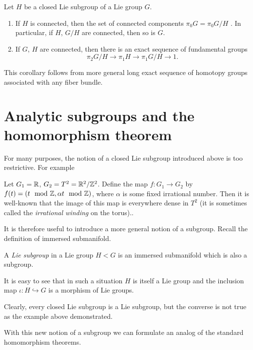 \begin{corollary}
  Let $H$ be a closed Lie subgroup of a Lie group $G$.
  \begin{enumerate}[label=\textnormal{(\arabic*)}]
  \item If $H$ is connected, then the set of connected components
    $\pi_0G=\pi_0G/H$ . In particular, if $H$, $G/H$ are connected, then so
    is $G$.
  \item If $G$, $H$ are connected, then there is an exact sequence of
    fundamental groups
    \[
      \pi_2G/H\longrightarrow
      \pi_1H\longrightarrow
      \pi_1G/H\longrightarrow
      1.
    \]
  \end{enumerate}
\end{corollary}
This corollary follows from more general long exact sequence of homotopy
groups associated with any fiber bundle.

\section{Analytic subgroups and the homomorphism theorem}
For many purposes, the notion of a closed Lie subgroup introduced above is
too restrictive. For example
\begin{example}
  Let $G_1=\mathbb{R}$, $G_2= T^2=\mathbb{R}^2/\mathbb{Z}^2$. Define the map
  $f\colon G_1\to G_2$ by $f(t)=(t\mod{\mathbb{Z}},\alpha t\mod{\mathbb{Z}})$, where
  $\alpha$ is some fixed irrational number. Then it is well-known that the
  image of this map is everywhere dense in $T^2$ (it is sometimes called
  the \emph{irrational winding} on the torus)..
\end{example}

It is therefore useful to introduce a more general notion of a
subgroup. Recall the definition of immersed submanifold.

\begin{definition}
  A \emph{Lie subgroup} in a Lie  group $H<G$ is an immersed submanifold
  which is also a subgroup.
\end{definition}

It is easy to see that in such a situation $H$ is itself a Lie group and
the inclusion map $\iota\colon H\hookrightarrow G$ is a morphism of Lie
groups.

Clearly, every closed Lie subgroup is a Lie subgroup, but the converse is
not true as the example above demonstrated.

With this new notion of a subgroup we can formulate an analog of the
standard homomorphism theorems.

